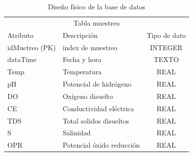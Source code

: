 \begin{table}[H]
\centering
\caption{Dise\~no f\'isico de la base de datos}
\label{tab:tablasBD}
\begin{tabular}{@{}llc@{}}
\toprule
\multicolumn{3}{c}{Tabla muestreo}                        \\ 
Atributo       & Descripci\'on               & Tipo de dato \\ \midrule
idMuetreo (PK) & index de muestreo         & INTEGER      \\
dataTime       & Fecha y hora              & TEXTO        \\
Temp           & Temperatura               & REAL         \\
pH             & Potencial de hidr\'ogeno    & REAL         \\
DO             & Ox\'igeno disuelto          & REAL         \\
CE             & Conductividad el\'ectrica   & REAL         \\
TDS            & Total solidos disueltos   & REAL         \\
S              & Salinidad                 & REAL         \\
OPR            & Potencial \'oxido reducci\'on & REAL         \\ \bottomrule
\end{tabular}
\end{table}

